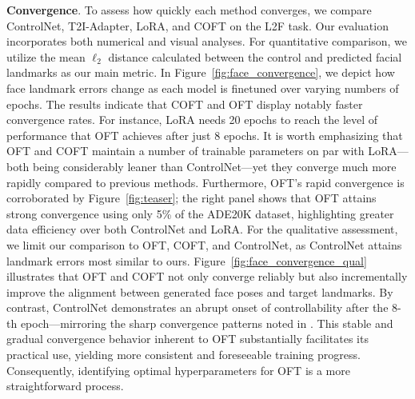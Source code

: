 \textbf{Convergence}. To assess how quickly each method converges, we compare ControlNet, T2I-Adapter, LoRA, and COFT on the L2F task. Our evaluation incorporates both numerical and visual analyses. For quantitative comparison, we utilize the mean $\ell_2$ distance calculated between the control and predicted facial landmarks as our main metric. In Figure~\ref{fig:face_convergence}, we depict how face landmark errors change as each model is finetuned over varying numbers of epochs. The results indicate that COFT and OFT display notably faster convergence rates. For instance, LoRA needs 20 epochs to reach the level of performance that OFT achieves after just 8 epochs. It is worth emphasizing that OFT and COFT maintain a number of trainable parameters on par with LoRA—both being considerably leaner than ControlNet—yet they converge much more rapidly compared to previous methods. Furthermore, OFT’s rapid convergence is corroborated by Figure~\ref{fig:teaser}; the right panel shows that OFT attains strong convergence using only 5\% of the ADE20K dataset, highlighting greater data efficiency over both ControlNet and LoRA. For the qualitative assessment, we limit our comparison to OFT, COFT, and ControlNet, as ControlNet attains landmark errors most similar to ours. Figure~\ref{fig:face_convergence_qual} illustrates that OFT and COFT not only converge reliably but also incrementally improve the alignment between generated face poses and target landmarks. By contrast, ControlNet demonstrates an abrupt onset of controllability after the 8-th epoch—mirroring the sharp convergence patterns noted in \cite{zhang2023adding}. This stable and gradual convergence behavior inherent to OFT substantially facilitates its practical use, yielding more consistent and foreseeable training progress. Consequently, identifying optimal hyperparameters for OFT is a more straightforward process.

